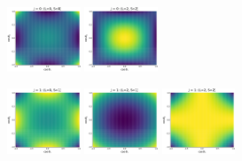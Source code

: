 \documentclass[prd,preprintnumbers,floatfix,
nofootinbib,superscriptaddress]{revtex4}
\begin{document}
\begin{figure}
  \includegraphics[width=0.195\textwidth]{../plots/map_JLS_000.pdf}
  \includegraphics[width=0.195\textwidth]{../plots/map_JLS_022.pdf}
  \caption{}
  \label{fig.j0}
\end{figure}
\begin{figure}
  \includegraphics[width=0.195\textwidth]{../plots/map_JLS_101.pdf}
  \includegraphics[width=0.195\textwidth]{../plots/map_JLS_121.pdf}
  \includegraphics[width=0.195\textwidth]{../plots/map_JLS_122.pdf}
  \caption{}
  \label{fig.j1}
\end{figure}
\end{document}

